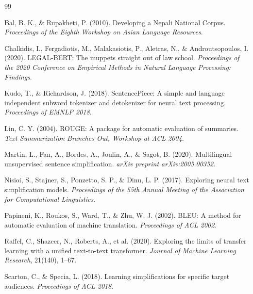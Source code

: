 \documentclass[12pt]{report}
\begin{document}




\cleardoublepage
{}
{}

\begin{thebibliography}{99}

Bal, B. K., \& Rupakheti, P. (2010).
Developing a Nepali National Corpus.
\textit{Proceedings of the Eighth Workshop on Asian Language Resources}.

Chalkidis, I., Fergadiotis, M., Malakasiotis, P., Aletras, N., \& Androutsopoulos, I. (2020).
LEGAL-BERT: The muppets straight out of law school.
\textit{Proceedings of the 2020 Conference on Empirical Methods in Natural Language Processing: Findings}.

Kudo, T., \& Richardson, J. (2018).
SentencePiece: A simple and language independent subword tokenizer and detokenizer for neural text processing.
\textit{Proceedings of EMNLP 2018}.

Lin, C. Y. (2004).
ROUGE: A package for automatic evaluation of summaries.
\textit{Text Summarization Branches Out, Workshop at ACL 2004}.

Martin, L., Fan, A., Bordes, A., Joulin, A., \& Sagot, B. (2020).
Multilingual unsupervised sentence simplification.
\textit{arXiv preprint arXiv:2005.00352}.

Nisioi, S., Stajner, S., Ponzetto, S. P., \& Dinu, L. P. (2017).
Exploring neural text simplification models.
\textit{Proceedings of the 55th Annual Meeting of the Association for Computational Linguistics}.

Papineni, K., Roukos, S., Ward, T., \& Zhu, W. J. (2002).
BLEU: A method for automatic evaluation of machine translation.
\textit{Proceedings of ACL 2002}.

Raffel, C., Shazeer, N., Roberts, A., et al. (2020).
Exploring the limits of transfer learning with a unified text-to-text transformer.
\textit{Journal of Machine Learning Research}, 21(140), 1--67.

Scarton, C., \& Specia, L. (2018).
Learning simplifications for specific target audiences.
\textit{Proceedings of ACL 2018}.


\end{thebibliography}
\end{document}
